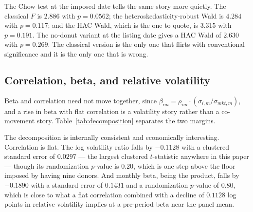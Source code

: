 \documentclass[12pt,a4paper]{article}
\begin{document}
The Chow test at the imposed date tells the same story more quietly. The classical $F$ is
$2.886$ with $p = 0.0562$; the heteroskedasticity-robust Wald is
$4.284$ with $p = 0.117$; and the HAC Wald, which is the one to quote, is
$3.315$ with $p = 0.191$. The no-donut variant at the listing date gives a HAC Wald of
$2.630$ with $p = 0.269$. The classical version is the only one that flirts with conventional significance and it is the only one that is wrong.

\subsection{Correlation, beta, and relative volatility}

Beta and correlation need not move together, since $\beta_{im} = \rho_{im}\cdot(\sigma_{i,m}/\sigma_{mkt,m})$, and a rise in beta with flat correlation is a volatility story rather than a co-movement story. Table~\ref{tab:decomposition} separates the two margins.



The decomposition is internally consistent and economically interesting. Correlation is flat. The log volatility ratio falls by
$-0.1128$ with a clustered standard error of $0.0297$ — the largest clustered $t$-statistic anywhere in this paper — though its randomization $p$-value is
$0.20$, which is one step above the floor imposed by having nine donors. And monthly beta, being the product, falls by
$-0.1890$ with a standard error of $0.1431$ and a randomization $p$-value of
$0.80$, which is close to what a flat correlation combined with a decline of $0.1128$ log points in relative volatility implies at a pre-period beta near the panel mean.
\end{document}
